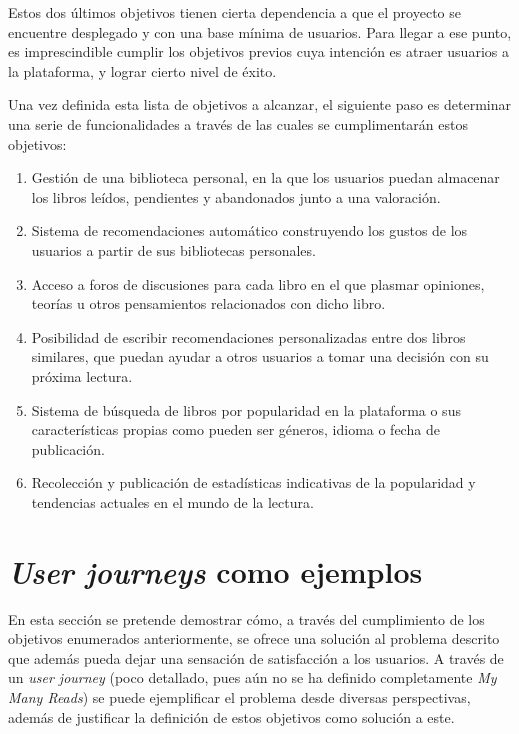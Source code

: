 Estos dos últimos objetivos tienen cierta dependencia a que el proyecto se encuentre desplegado y con una base mínima de usuarios. Para llegar a ese punto, es imprescindible cumplir los objetivos previos cuya intención es atraer usuarios a la plataforma, y lograr cierto nivel de éxito.

Una vez definida esta lista de objetivos a alcanzar, el siguiente paso es determinar una serie de funcionalidades a través de las cuales se cumplimentarán estos objetivos:

\begin{enumerate}[label=\textbf{F-\arabic*}]
    \item Gestión de una biblioteca personal, en la que los usuarios puedan almacenar los libros leídos, pendientes y abandonados junto a una valoración.
    \item Sistema de recomendaciones automático construyendo los gustos de los usuarios a partir de sus bibliotecas personales.
    \item Acceso a foros de discusiones para cada libro en el que plasmar opiniones, teorías u otros pensamientos relacionados con dicho libro.
    \item Posibilidad de escribir recomendaciones personalizadas entre dos libros similares, que puedan ayudar a otros usuarios a tomar una decisión con su próxima lectura.
    \item Sistema de búsqueda de libros por popularidad en la plataforma o sus características propias como pueden ser géneros, idioma o fecha de publicación.
    \item Recolección y publicación de estadísticas indicativas de la popularidad y tendencias actuales en el mundo de la lectura.
\end{enumerate}

\section{\textit{User journeys} como ejemplos}
\label{user journeys}

En esta sección se pretende demostrar cómo, a través del cumplimiento de los objetivos enumerados anteriormente, se ofrece una solución al problema descrito que además pueda dejar una sensación de satisfacción a los usuarios. A través de un \textit{user journey} (poco detallado, pues aún no se ha definido completamente \textit{My Many Reads}) se puede ejemplificar el problema desde diversas perspectivas, además de justificar la definición de estos objetivos como solución a este.

